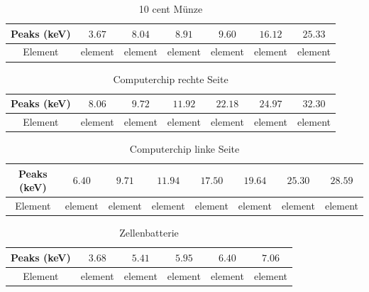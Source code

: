 \documentclass[a4paper,14pt]{article}
\begin{document}
\begin{table}[H]
	\renewcommand{\arraystretch}{1}
	\centering
	\Large
	\begin{adjustbox}{width=\textwidth}
		\begin{tabular}{|c|c|c|c|c|c|c|}
			\hline
			Peaks (keV) & $3.67$ & $8.04$ & $8.91$ & $9.60$ & $16.12$ & $25.33$ \\
			\hline
			Element & element & element & element & element & element & element \\
			\hline
		\end{tabular}
	\end{adjustbox}
	\caption{ 10 cent M\"unze}
	\label{tab: }
\end{table}
\begin{table}[H]
	\renewcommand{\arraystretch}{1}
	\centering
	\Large
	\begin{adjustbox}{width=\textwidth}
		\begin{tabular}{|c|c|c|c|c|c|c|}
			\hline
			Peaks (keV) & $8.06$ & $9.72$ & $11.92$ & $22.18$ & $24.97$ & $32.30$ \\
			\hline
			Element & element & element & element & element & element & element \\
			\hline
		\end{tabular}
	\end{adjustbox}
	\caption{ Computerchip rechte Seite }
	\label{tab: }
\end{table}
\begin{table}[H]
	\renewcommand{\arraystretch}{1}
	\centering
	\Large
	\begin{adjustbox}{width=\textwidth}
		\begin{tabular}{|c|c|c|c|c|c|c|c|}
			\hline
			Peaks (keV) & $6.40$ & $9.71$ & $11.94$ & $17.50$ & $19.64$ & $25.30$ & $28.59$ \\
			\hline
			Element & element & element & element & element & element & element & element \\
			\hline
		\end{tabular}
	\end{adjustbox}
	\caption{ Computerchip linke Seite }
	\label{tab: }
\end{table}
\begin{table}[H]
	\renewcommand{\arraystretch}{1}
	\centering
	\Large
	\begin{adjustbox}{width=\textwidth}
		\begin{tabular}{|c|c|c|c|c|c|}
			\hline
			Peaks (keV) & $3.68$ & $5.41$ & $5.95$ & $6.40$ & $7.06$ \\
			\hline
			Element & element & element & element & element & element \\
			\hline
		\end{tabular}
	\end{adjustbox}
	\caption{ Zellenbatterie }
	\label{tab: }
\end{table}
\end{document}
